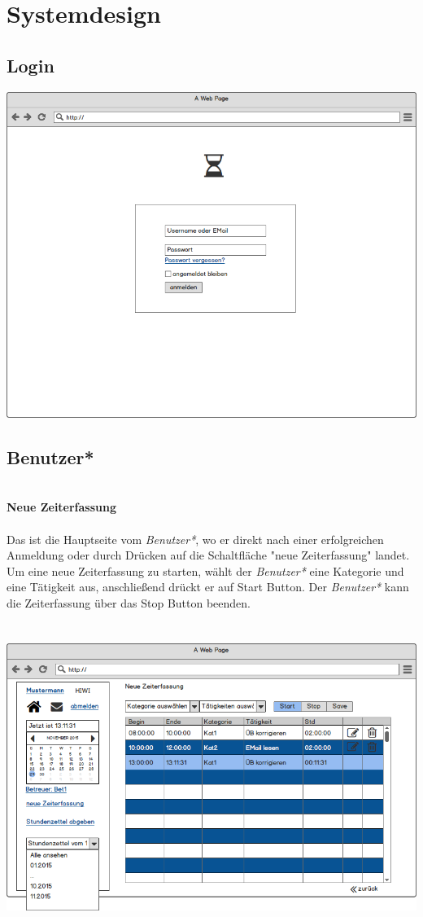 \section{Systemdesign}

\subsection{Login}
\includegraphics[width=\linewidth]{UI/Login/Login.png}

\newpage
\subsection{Benutzer*}

\textbf{\\Neue Zeiterfassung}\\
\\
Das ist die Hauptseite vom \emph{Benutzer*}, wo er direkt nach einer erfolgreichen Anmeldung oder durch Drücken auf die Schaltfläche "neue Zeiterfassung" landet. \\
Um eine neue Zeiterfassung zu starten, wählt der \emph{Benutzer*} eine Kategorie und eine Tätigkeit aus, anschließend drückt er auf Start Button. Der \emph{Benutzer*} kann die Zeiterfassung über das Stop Button beenden.\\
\\
\\
\includegraphics[width=\linewidth]{UI/Benutzer/Zeiterfassung.png}


